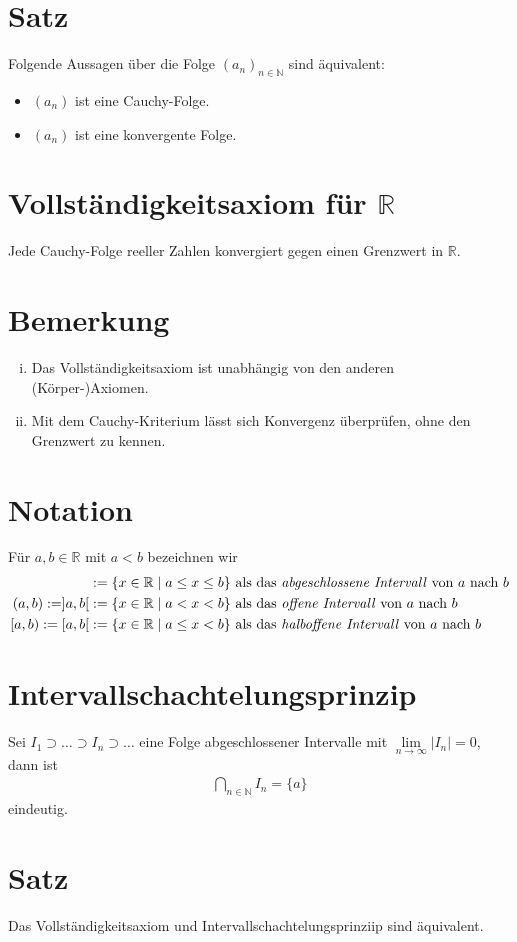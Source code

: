 \documentclass{scrreprt}
\newcommand{\NN}{\mathbb{N}}
\newcommand{\RR}{\mathbb{R}}
\begin{document}
    \section{Satz}
    Folgende Aussagen über die Folge $(a_n)_{n \in \NN}$ sind äquivalent:
    \begin{itemize}
        \item
            $(a_n)$ ist eine Cauchy-Folge.
        \item
            $(a_n)$ ist eine konvergente Folge.
    \end{itemize}

    \section{Vollständigkeitsaxiom für $\RR$}
    Jede Cauchy-Folge reeller Zahlen konvergiert gegen einen Grenzwert in $\RR$.

    \section{Bemerkung}
    \begin{enumerate}[i)]
        \item
            Das Vollständigkeitsaxiom ist unabhängig von den anderen (Körper-)Axiomen.
        \item
            Mit dem Cauchy-Kriterium lässt sich Konvergenz überprüfen, ohne den Grenzwert zu kennen.
    \end{enumerate}

    \section{Notation}
    Für $a,b \in \RR$ mit $a < b$ bezeichnen wir
    \begin{align*}
        [a,b] &:= \lbrace x \in \RR \mid a \leq x \leq b \rbrace \text{ als das \emph{abgeschlossene Intervall} von $a$ nach $b$}\\
        (a,b) := ]a,b[ &:= \lbrace x \in \RR \mid a < x < b \rbrace \text{ als das \emph{offene Intervall} von $a$ nach $b$}\\
        [a,b) := [a,b[ &:= \lbrace x \in \RR \mid a \leq x < b \rbrace \text{ als das \emph{halboffene Intervall} von $a$ nach $b$}
    \end{align*}

    \newcommand{\sebsut}{\supset}
    \newcommand{\sebsuteq}{\supseteq}

    \section{Intervallschachtelungsprinzip}
    Sei $I_1 \sebsut \dots \sebsut I_n \sebsut \dots$ eine Folge abgeschlossener Intervalle mit $\lim\limits_{n \to \infty} |I_n| = 0$, dann ist
    \begin{align*}
        \bigcap_{n \in \NN} I_n = \lbrace a \rbrace
    \end{align*}
    eindeutig.

    \section{Satz}
    Das Vollständigkeitsaxiom und Intervallschachtelungsprinziip sind äquivalent.

    
\end{document}
